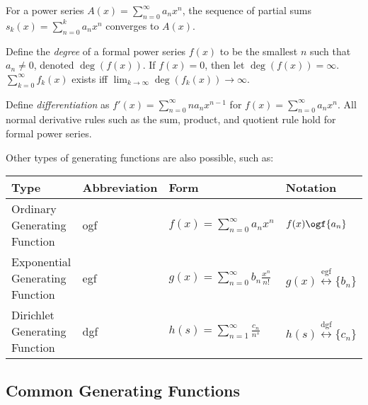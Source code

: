 \documentclass[a4paper]{article}
\begin{document}
\begin{example}
For a power series $A(x)=\sum_{n=0}^\infty a_nx^n$, the sequence of partial sums $s_k(x)=\sum_{n=0}^ka_nx^n$ converges to $A(x)$.
\end{example}

\begin{proposition}
Define the \emph{degree} of a formal power series $f(x)$ to be the smallest $n$ such that $a_n\neq0$, denoted $\deg(f(x))$. If $f(x)=0$, then let $\deg(f(x))=\infty$. $\sum_{k=0}^\infty f_k(x)$ exists iff $\lim_{k\rightarrow\infty}\deg(f_k(x))\rightarrow\infty$.
\end{proposition}

\begin{proposition}
Define \emph{differentiation} as $f'(x)=\sum_{n=0}^\infty na_nx^{n-1}$ for $f(x)=\sum_{n=0}^\infty a_nx^n$. All normal derivative rules such as the sum, product, and quotient rule hold for formal power series.
\end{proposition}

\begin{definition}
Other types of generating functions are also possible, such as:
\begin{table}[H]
\centering
\begin{NiceTabular}{llll}\toprule
Type&Abbreviation&Form&Notation\\\midrule
Ordinary Generating Function&ogf&$f(x)=\sum_{n=0}^\infty a_nx^n$&$f(x)\ogf \{a_n\}$\\
Exponential Generating Function&egf&$g(x)=\sum_{n=0}^\infty b_n\frac{x^n}{n!}$&$g(x)\overset{\text{egf}}{\longleftrightarrow}\{b_n\}$\\
Dirichlet Generating Function&dgf&$h(s)=\sum_{n=1}^\infty\frac{c_n}{n^s}$&$h(s)\overset{\text{dgf}}{\longleftrightarrow}\{c_n\}$\\\bottomrule
\end{NiceTabular}
\end{table}
\end{definition}

\subsection{Common Generating Functions}
\end{document}
